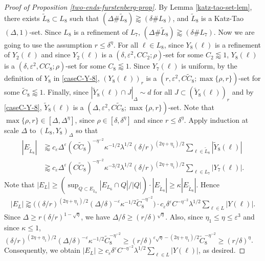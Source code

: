 \documentclass{amsart}
\numberwithin{equation}{section}
\newcommand{\de}{\delta}
\newcommand{\De}{\Delta}
\newcommand{\e}{\varepsilon}
\newcommand{\la}{\lambda}
\begin{document}
\begin{proof}[Proof of Proposition \ref{two-ends-furstenberg-prop}]
By Lemma \ref{katz-tao-set-lem}, there exists $\tilde L_8\subset L_8$ such that $(\De\# \tilde L_8)\gtrapprox (\de \# L_8)$, and $\tilde L_8$ is a Katz-Tao $(\De,1)$-set.
Since $L_8$ is a refinement of $L_7$, $(\De\# \tilde L_8)\gtrapprox (\de \# L_7)$.
Now we are going to use the assumption $r\leq\de^{\eta}$.
For all $\ell\in L_8$, since $Y_8(\ell)$ is a refinement of $Y_2(\ell)$ and since $Y_2(\ell)$ is a $(\de,\e^2,CC_2;\rho)$-set for some $C_2\lessapprox1$, $Y_8(\ell)$ is a $(\de,\e^2,CC_8;\rho)$-set for some $C_8\lessapprox1$.
Since $Y_7(\ell)$ is uniform, by the definition of $Y_8$ in \eqref{caseC-Y-8}, $(Y_8(\ell))_r$ is a $(r,\e^2,C\tilde C_8;\max\{\rho,r\})$-set for some $\tilde C_8\lessapprox1$.
Finally, since $|\tilde Y_8(\ell)\cap J|_\De\sim d$ for all $J\subset (\tilde Y_8(\ell))_r$ and by \eqref{caseC-Y-8}, 
$\tilde Y_8(\ell)$ is a $(\De,\e^2,C\tilde C_8;\max\{\rho,r\})$-set.
Note that $\max\{\rho,r\}\in[\De,\De^\eta]$, since $\rho\in[\de,\de^\eta]$ and since $r\leq\de^{\eta}$.
Apply induction at scale $\De$ to $(L_8, Y_8)_{\De}$ so that 
\begin{align}
    |E_{\tilde L_8}|&\gtrapprox  c_\e \De^{\e}(C\tilde C_8)^{-\eta^{-2}}\kappa^{-1/2}\la^{1/2}(\de/r)^{(2\eta+\eta_1)/2}\sum_{\ell\in \tilde L_8}|\tilde Y_8(\ell)|\\
    &\gtrapprox c_\e \De^{\e}(C\tilde C_8)^{-\eta^{-2}}\kappa^{-3/2}\la^{1/2}(\de/r)^{(2\eta+ \eta_1)/2}\sum_{\ell\in L_7}|Y_7(\ell)|.
\end{align}
Note that $|E_L|\geq(\sup_{Q\subset E_{\tilde L_8}}|E_{L_6}\cap Q|/|Q|) \cdot |E_{\tilde L_8}|\geq \kappa  |E_{\tilde L_8}|$. Hence
\begin{align}
    |E_L|\gtrapprox \big((\de/r)^{(2\eta+\eta_1)/2}(\De/\de)^{-\e}\kappa^{-1/2}\tilde C_8^{-\eta^{-2}}\big)\cdot c_\e \de^{\e}C^{-\eta^{-2}}\la^{1/2}\sum_{\ell\in L}|Y(\ell)|.
\end{align}
Since $\De\geq r(\de/r)^{1-\sqrt{\eta}}$, we have $\De/\de\geq (r/\de)^{\sqrt{\eta}}$. 
Also, since $\eta_1\leq\eta\leq\e^{3}$ and since $\kappa\leq1$,  $(\de/r)^{(2\eta+\eta_1)/2}(\De/\de)^{-\e}\kappa^{-1/2}\tilde C_8^{-\eta^{-2}}\geq (r/\de)^{\e\sqrt{\eta}-(2\eta+\eta_1)/2}\tilde C_8^{-\eta^{-2}}\geq (r/\de)^{\eta}$. 
Consequently, we obtain $|E_L|\geq c_\e \de^{\e}C^{-\eta^{-2}}\la^{1/2}\sum_{\ell\in L}|Y(\ell)|$, as desired. \qedhere


\end{proof}


\bigskip

\end{document}
